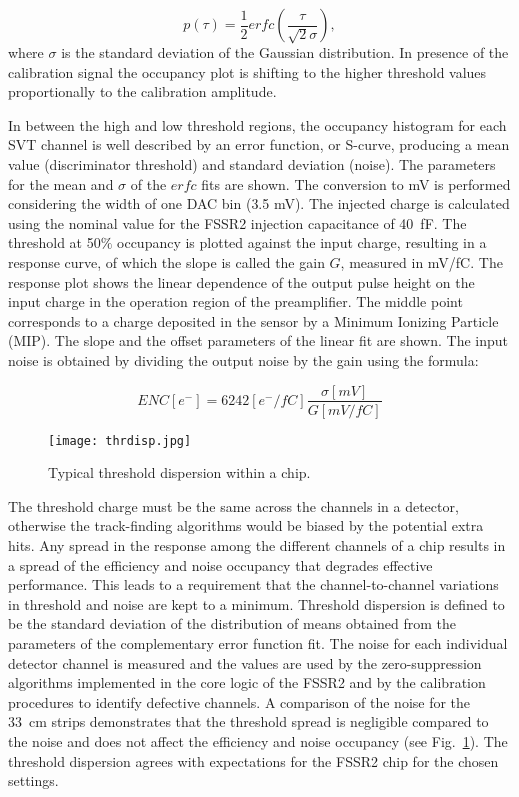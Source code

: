 \begin{equation} p(\tau)=\frac{1}{2} erfc(\frac{\tau}{\sqrt{2}\sigma})  \label{eq:erfc},
\end{equation}
where $\sigma$ is the standard deviation of the Gaussian distribution. In presence of the calibration signal the occupancy plot is shifting to the higher threshold values proportionally to the calibration amplitude.

In between the high and low threshold regions, the occupancy histogram for each SVT channel is well described by an error function, or S-curve, producing a mean value (discriminator threshold) and standard deviation (noise). The parameters for the mean and $\sigma$ of the $erfc$ fits are shown. The conversion to mV is performed considering the width of one DAC bin (3.5 mV). The injected charge is calculated using the nominal value for the FSSR2 injection capacitance of 40~fF. The threshold at 50$\%$ occupancy is plotted against the input charge, resulting in a response curve, of which the slope is called the gain $G$, measured in mV/fC. The response plot shows the linear dependence of the output pulse height on the input charge in the operation region of the preamplifier. The middle point corresponds to a charge deposited in the sensor by a Minimum Ionizing Particle (MIP). The slope and the offset parameters of the linear fit are shown. The input noise is obtained by dividing the output noise by the gain using the formula:

\begin{equation} ENC[e^{-}]=6242[e^{-}/fC]\frac{\sigma[mV]}{G[mV/fC]}  \label{eq:enc}
\end{equation}

\begin{figure}[hbt] 
	\centering 
	\texttt{[image: thrdisp.jpg]}
	\caption{Typical threshold dispersion within a chip.}
	\label{fig:thrdisp}
\end{figure}

The threshold charge must be the same across the channels in a detector, otherwise the track-finding algorithms would be biased by the potential extra hits. Any spread in the response among the different channels of a chip results in a spread of the efficiency and noise occupancy that degrades effective performance. This leads to a requirement that the channel-to-channel variations in threshold and noise are kept to a minimum. Threshold dispersion is defined to be the standard deviation of the distribution of means obtained from the parameters of the complementary error function fit. The noise for each individual detector channel is measured and the values are used by the zero-suppression algorithms implemented in the core logic of the FSSR2 and by the calibration procedures to identify defective channels. A comparison of the noise for the 33~cm strips demonstrates that the threshold spread is negligible compared to the noise and does not affect the efficiency and noise occupancy (see Fig.~\ref{fig:thrdisp}). The threshold dispersion agrees with expectations for the FSSR2 chip for the chosen settings.

